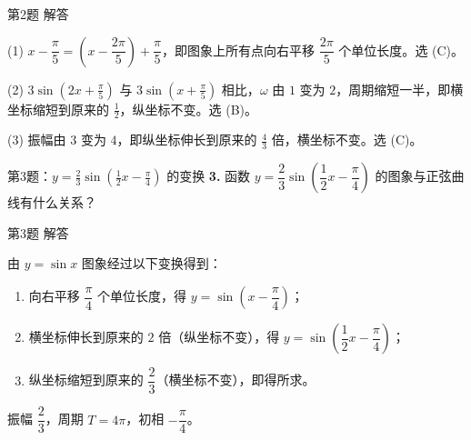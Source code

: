 \documentclass[10pt,aspectratio=169,serif]{beamer}
\begin{document}
\begin{frame}[t]{第2题 解答}
\begin{tcolorbox}[colback=orange!10,colframe=orange,title=\textbf{解}]
(1) $x-\dfrac{\pi}{5}=\left(x-\dfrac{2\pi}{5}\right)+\dfrac{\pi}{5}$，即图象上所有点向右平移 $\dfrac{2\pi}{5}$ 个单位长度。\alert{选 (C)}。

(2) $3\sin(2x+\frac{\pi}{5})$ 与 $3\sin(x+\frac{\pi}{5})$ 相比，$\omega$ 由 $1$ 变为 $2$，周期缩短一半，即横坐标缩短到原来的 $\frac12$，纵坐标不变。\alert{选 (B)}。

(3) 振幅由 $3$ 变为 $4$，即纵坐标伸长到原来的 $\frac43$ 倍，横坐标不变。\alert{选 (C)}。
\end{tcolorbox}
\end{frame}

\begin{frame}[t]{第3题：$y=\frac23\sin(\frac12 x-\frac{\pi}{4})$ 的变换}
\textbf{3.} 函数 $y=\dfrac23\sin\!\left(\dfrac12 x-\dfrac{\pi}{4}\right)$ 的图象与正弦曲线有什么关系？
\end{frame}

\begin{frame}[t]{第3题 解答}
\begin{tcolorbox}[colback=orange!10,colframe=orange,title=\textbf{解}]
由 $y=\sin x$ 图象经过以下变换得到：
\begin{enumerate}
  \item 向右平移 $\dfrac{\pi}{4}$ 个单位长度，得 $y=\sin\!\left(x-\dfrac{\pi}{4}\right)$；
  \item 横坐标伸长到原来的 $2$ 倍（纵坐标不变），得 $y=\sin\!\left(\dfrac12 x-\dfrac{\pi}{4}\right)$；
  \item 纵坐标缩短到原来的 $\dfrac23$（横坐标不变），即得所求。
\end{enumerate}
振幅 $\dfrac23$，周期 $T=4\pi$，初相 $-\dfrac{\pi}{4}$。
\end{tcolorbox}
\begin{center}
\end{center}
\end{frame}
\end{document}
